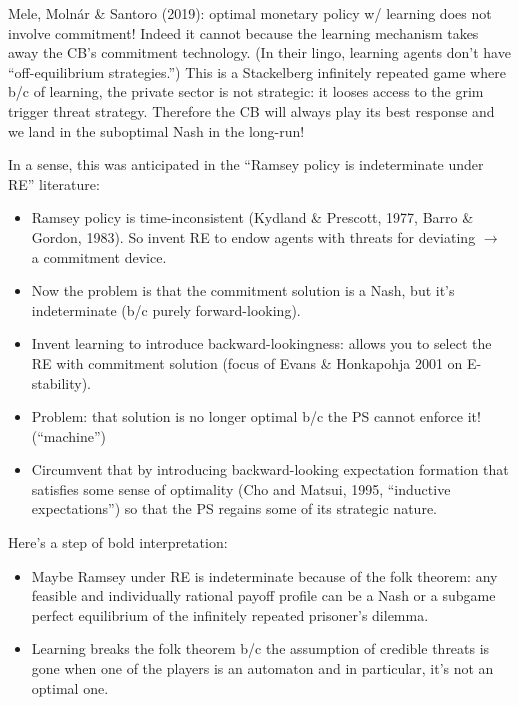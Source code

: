 \documentclass[11pt]{article}
\renewcommand{\[}{\begin{equation}}
\renewcommand{\]}{\end{equation}}
\begin{document}
 Mele, Moln\'ar \& Santoro (2019): optimal monetary policy w/ learning does not involve commitment! Indeed it cannot because the learning mechanism takes away the CB's commitment technology. (In their lingo, learning agents don't have ``off-equilibrium strategies.'') This is a Stackelberg infinitely repeated game where b/c of learning, the private sector is not strategic: it looses access to the grim trigger threat strategy. Therefore the CB will always play its best response and we land in the suboptimal Nash in the long-run!
 
 In a sense, this was anticipated in the ``Ramsey policy is indeterminate under RE'' literature:
 \begin{itemize}
 \item Ramsey policy is time-inconsistent (Kydland \& Prescott, 1977, Barro \& Gordon, 1983). So invent RE to endow agents with threats for deviating $\rightarrow$ a commitment device.
 \item Now the problem is that the commitment solution is a Nash, but it's indeterminate (b/c purely forward-looking).
 \item Invent learning to introduce backward-lookingness: allows you to select the RE with commitment solution (focus of Evans \& Honkapohja 2001 on E-stability).
 \item Problem: that solution is no longer optimal b/c the PS cannot enforce it! (``machine'')
 \item Circumvent that by introducing backward-looking expectation formation that satisfies some sense of optimality (Cho and Matsui, 1995, ``inductive expectations'') so that the PS regains some of its strategic nature.
 \end{itemize}
 
 Here's a step of bold interpretation:
 \begin{itemize}
 \item Maybe Ramsey under RE is indeterminate because of the folk theorem: any feasible and individually rational payoff profile can be a Nash or a subgame perfect equilibrium of the infinitely repeated prisoner's dilemma.
 \item Learning breaks the folk theorem b/c the assumption of credible threats is gone when one of the players is an automaton and in particular, it's not an optimal one. 
 \end{itemize}



 
\end{document}
